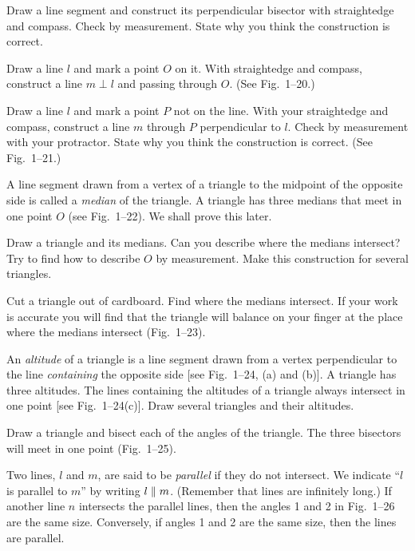 \documentclass[11pt]{book}
\begin{document}
\begin{exercisecols}
\begin{exlist}
      Draw a line segment and construct its perpendicular bisector with
      straightedge and compass. Check by measurement. State why you think the
      construction is correct.
\exfig{\FIGININETEEN}
\item Draw a line $l$ and mark a point $O$ on it. With straightedge and compass,
      construct a line $m \perp l$ and passing through $O$. (See Fig.~1--20.)
\exfig{\FIGITWENTY}
\item Draw a line $l$ and mark a point $P$ not on the line. With your straightedge
      and compass, construct a line $m$ through $P$ perpendicular to $l$. Check by
      measurement with your protractor. State why you think the construction is
      correct. (See Fig.~1--21.)
\exfig{\FIGITWENTYONE}
\item A line segment drawn from a vertex of a triangle to the midpoint of the
      opposite side is called a \emph{median} of the triangle. A triangle has
      three medians that meet in one point $O$ (see Fig.~1--22). We shall prove
      this later.

      Draw a triangle and its medians. Can you describe where the medians
      intersect? Try to find how to describe $O$ by measurement. Make this
      construction for several triangles.
\exfig{\FIGITWENTYTWO}
\item Cut a triangle out of cardboard. Find where the medians intersect. If your
      work is accurate you will find that the triangle will balance on your finger
      at the place where the medians intersect (Fig.~1--23).
\exfig{\FIGITWENTYTHREE}
\item An \emph{altitude} of a triangle is a line segment drawn from a vertex
      perpendicular to the line \emph{containing} the opposite side [see
      Fig.~1--24, (a) and (b)]. A triangle has three altitudes. The lines
      containing the altitudes of a triangle always intersect in one point [see
      Fig.~1--24(c)]. Draw several triangles and their altitudes.
\exfig{\FIGITWENTYFOUR}
\item Draw a triangle and bisect each of the angles of the triangle. The three
      bisectors will meet in one point (Fig.~1--25).
\exfig{\FIGITWENTYFIVE}
\item Two lines, $l$ and $m$, are said to be \emph{parallel} if they do not
      intersect. We indicate ``$l$ is parallel to $m$'' by writing $l \mathrel{\|} m$.
      (Remember that lines are infinitely long.) If another line $n$ intersects
      the parallel lines, then the angles 1 and 2 in Fig.~1--26 are the same size.
      Conversely, if angles 1 and 2 are the same size, then the lines are
      parallel.


\end{exlist}
\end{exercisecols}
\end{document}

